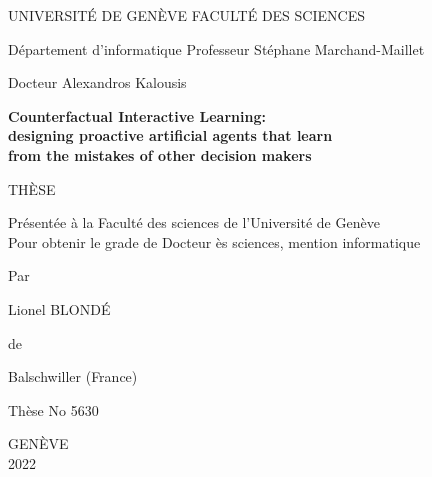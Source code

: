 \documentclass[11pt,a4paper]{book}
\begin{document}
\begin{titlepage}

\thispagestyle{empty}

\large

UNIVERSITÉ DE GENÈVE \hfill FACULTÉ DES SCIENCES

\vspace{0.7em}

Département d'informatique \hfill Professeur Stéphane Marchand-Maillet

\hfill Docteur Alexandros Kalousis

\vspace{-0.5em}

\hrulefill

\vspace{5em}

\begin{center}

\begin{LARGE}
\textbf{Counterfactual Interactive Learning: \\
designing proactive artificial agents that learn \\
from the mistakes of other decision makers}
\end{LARGE}

\vspace{3.8em}

THÈSE

\vspace{1em}

Présentée à la Faculté des sciences de l'Université de Genève \\
Pour obtenir le grade de Docteur ès sciences, mention informatique

\vspace{4em}

Par

\vspace{0.7em}

Lionel BLOND\'E

\vspace{0.8em}

de

\vspace{0.7em}

Balschwiller (France)

\vspace{5.5em}

Thèse No 5630

\vspace{4.5em}
GENÈVE \\
2022

\end{center}

\end{titlepage}
\end{document}
